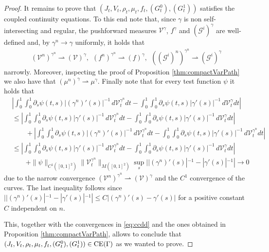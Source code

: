 \documentclass{article}
\begin{document}
\begin{proof}
    It remains to prove that $(J_t, V_t, \rho_t, \mu_t, f_t, ({G_t^0}), ({G_t^1}))$ satisfies the coupled continuity equations. To this end note that, since $\gamma$ is non self-intersecting and regular, the pushforward measures $\mathcal{V}^\gamma$, $f^\gamma$ and $({\mathcal{G}^i})^\gamma$ are well-defined and, by $\gamma^n \rightarrow \gamma$ uniformly, it holds that 
    \begin{align}\label{eq:ccdd}
        (\mathcal{V}^n)^{\gamma^n} \rightharpoonup (\mathcal{V})^{\gamma}, \ \ (f^n)^{\gamma^n} \rightharpoonup (f)^{\gamma}, \ \ ((\mathcal{G}^i)^n)^{\gamma^n} \rightharpoonup ({\mathcal{G}^i})^{\gamma}
    \end{align}
    narrowly. Moreover, inspecting the proof of Proposition \ref{thm:compactVarPath} we also have that $(\mu^n)^\gamma \rightharpoonup \mu^\gamma$. Finally note that for every test function $\psi$ it holds that 
    \begin{align*}
        & \left|\int_0^1\int_0^1 \partial_s \psi(t,s) |(\gamma^n)'(s)|^{-1} \, d\mathcal{V}_t^{\gamma^n} dt - \int_0^1\int_0^1 \partial_s \psi(t,s) |\gamma'(s)|^{-1} \, d\mathcal{V}_t^{\gamma} dt \right| \\
        & \leq \left|\int_0^1\int_0^1 \partial_s \psi(t,s) |\gamma'(s)|^{-1} \, d\mathcal{V}_t^{\gamma^n} dt - \int_0^1\int_0^1 \partial_s \psi(t,s) |\gamma'(s)|^{-1} \, d\mathcal{V}_t^{\gamma} dt \right| \\
        & \qquad  + \left|\int_0^1\int_0^1 \partial_s \psi(t,s) |(\gamma^n)'(s)|^{-1} \, d\mathcal{V}_t^{\gamma^n} dt - \int_0^1\int_0^1 \partial_s \psi(t,s) |\gamma'(s)|^{-1} \, d\mathcal{V}_t^{\gamma^n} dt \right|\\
        & \leq \left|\int_0^1\int_0^1 \partial_s \psi(t,s) |\gamma'(s)|^{-1} \, d\mathcal{V}_t^{\gamma^n} dt - \int_0^1\int_0^1 \partial_s \psi(t,s) |\gamma'(s)|^{-1} \, d\mathcal{V}_t^{\gamma} dt \right| \\ 
        & \qquad + \|\psi\|_{C^1([0,1]^2)} \|\mathcal{V}^{\gamma^n}_t\|_{M([0,1]^2)} \sup_s ||(\gamma^n)'(s)|^{-1} - |\gamma'(s)|^{-1}| \rightarrow 0
    \end{align*}
    due to the narrow convergence $(\mathcal{V}^n)^{\gamma^n} \rightharpoonup (\mathcal{V})^{\gamma}$ and the $C^1$ convergence of the curves. The last inequality follows since  $||(\gamma^n)'(s)|^{-1} - |\gamma'(s)|^{-1}| \leq C|(\gamma^n)'(s) - \gamma'(s)|$ for a positive constant $C$ independent on $n$.

    This, together with the convergences in \eqref{eq:ccdd} and the ones obtained in Proposition \ref{thm:compactVarPath}, allows to conclude that $(J_t, V_t, \rho_t, \mu_t, f_t, ({G_t^0}), ({G_t^1})) \in {\rm CE}(\Gamma)$ as we wanted to prove. 
\end{proof}
\end{document}
